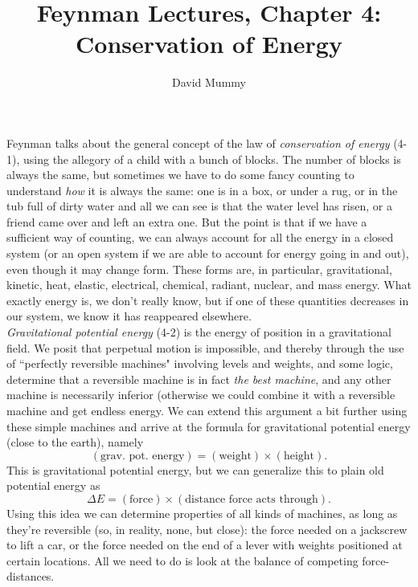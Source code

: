 \documentclass[10pt,letterpaper]{article}
\author{David Mummy}
\title{Feynman Lectures, Chapter 4: Conservation of Energy}
\begin{document}
\maketitle
\indent Feynman talks about the general concept of the law of \textit{conservation of energy} (4-1), using the allegory of a child with a bunch of blocks. The number of blocks is always the same, but sometimes we have to do some fancy counting to understand \textit{how} it is always the same: one is in a box, or under a rug, or in the tub full of dirty water and all we can see is that the water level has risen, or a friend came over and left an extra one. But the point is that if we have a sufficient way of counting, we can always account for all the energy in a closed system (or an open system if we are able to account for energy going in and out), even though it may change form. These forms are, in particular, gravitational, kinetic, heat, elastic, electrical, chemical, radiant, nuclear, and mass energy. What exactly energy is, we don't really know, but if one of these quantities decreases in our system, we know it has reappeared elsewhere. \\ 
\indent \textit{Gravitational potential energy} (4-2) is the energy of position in a gravitational field. We posit that perpetual motion is impossible, and thereby through the use of ``perfectly reversible machines" involving levels and weights, and some logic, determine that a reversible machine is in fact \textit{the best machine}, and any other machine is necessarily inferior (otherwise we could combine it with a reversible machine and get endless energy. We can extend this argument a bit further using these simple machines and arrive at the formula for gravitational potential energy (close to the earth), namely
$$
(\textrm{grav. pot. energy}) = (\textrm{weight})  \times (\textrm{height}).
$$
This is gravitational potential energy, but we can generalize this to plain old potential energy as 
$$
\Delta E = (\textrm{force})  \times  (\textrm{distance force acts through}).
$$
Using this idea we can determine properties of all kinds of machines, as long as they're reversible (so, in reality, none, but close): the force needed on a jackscrew to lift a car, or the force needed on the end of a lever with weights positioned at certain locations. All we need to do is look at the balance of competing force-distances.
\end{document}
